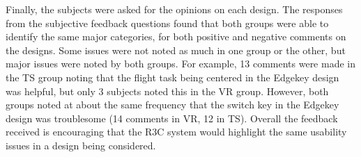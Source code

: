 Finally, the subjects were asked for the opinions on each design.
The responses from the subjective feedback questions found that both groups were able to identify the same major categories, for both positive and negative comments on the designs.
Some issues were not noted as much in one group or the other, but major issues were noted by both groups.
For example, 13 comments were made in the TS group noting that the flight task being centered in the Edgekey design was helpful, but only 3 subjects noted this in the VR group.
However, both groups noted at about the same frequency that the switch key in the Edgekey design was troublesome (14 comments in VR, 12 in TS).
Overall the feedback received is encouraging that the R3C system would highlight the same usability issues in a design being considered.
